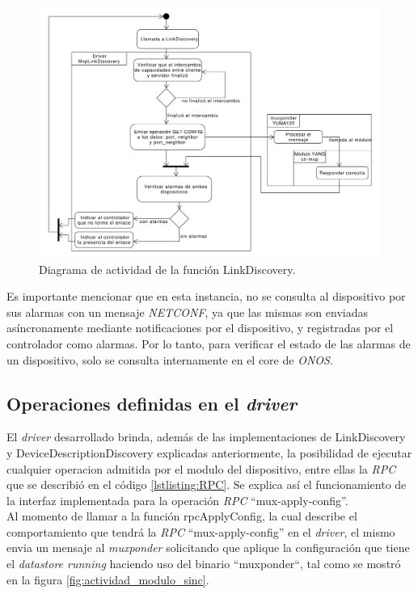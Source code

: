 \begin{figure}[!h]
    \centering
    \includegraphics[scale=0.43]{Figures/actividad_link.pdf}
    \caption{Diagrama de actividad de la función LinkDiscovery.}
    \label{fig:actividad_link}
  \end{figure}

  Es importante mencionar que en esta instancia, no se consulta al dispositivo por sus alarmas con un mensaje \textit{NETCONF}, ya que las mismas son enviadas asíncronamente mediante notificaciones por el dispositivo, y registradas por el controlador como alarmas. Por lo tanto, para verificar el estado de las alarmas de un dispositivo, solo se consulta internamente en el core de \textit{ONOS}.

  \subsection{Operaciones definidas en el \textit{driver}}

  El \textit{driver} desarrollado brinda, además de las implementaciones de LinkDiscovery y DeviceDescriptionDiscovery explicadas anteriormente, la posibilidad de ejecutar cualquier operacion admitida por el modulo del dispositivo, entre ellas la \textit{RPC} que se describió en el código \ref{lstlisting:RPC}. Se explica así el funcionamiento de la interfaz implementada para la operación \textit{RPC} “mux-apply-config”. 
  \\

  Al momento de llamar a la función rpcApplyConfig, la cual describe el comportamiento que tendrá la \textit{RPC} “mux-apply-config” en el \textit{driver}, el mismo envia un mensaje al \textit{muxponder} solicitando que aplique la configuración que tiene el \textit{datastore running} haciendo uso del binario “muxponder“, tal como se mostró en la figura \ref{fig:actividad_modulo_sinc}.
  
